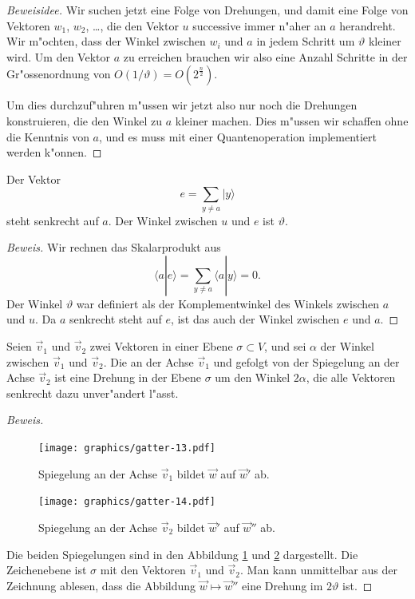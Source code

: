 \begin{proof}[Beweisidee]
Wir suchen jetzt eine Folge von Drehungen, und damit
eine Folge von Vektoren $w_1$, $w_2$, \dots, die den Vektor $u$ successive
immer n"aher an $a$ herandreht.
Wir m"ochten, dass der Winkel zwischen $w_i$ und $a$ in jedem Schritt 
um $\vartheta$ kleiner wird.
Um den Vektor $a$ zu erreichen brauchen wir also eine Anzahl Schritte
in der Gr"ossenordnung von $O(1/\vartheta)=O(2^{\frac{n}2})$.

Um dies durchzuf"uhren m"ussen wir jetzt also nur noch die Drehungen
konstruieren, die den Winkel zu $a$ kleiner machen.
Dies m"ussen wir schaffen ohne die Kenntnis von $a$, und es muss mit
einer Quantenoperation implementiert werden k"onnen.
\end{proof}

\begin{hilfssatz}
Der Vektor
\[
e=\sum_{y\ne a}|y\rangle
\]
steht senkrecht auf $a$.
Der Winkel zwischen $u$ und $e$ ist $\vartheta$.
\label{skript:hilfssatz-winkel}
\end{hilfssatz}

\begin{proof}[Beweis]
Wir rechnen das Skalarprodukt aus
\[
\langle a|e\rangle
=
\sum_{y\ne a}\langle a|y\rangle =0.
\]
Der Winkel $\vartheta$ war definiert als der Komplementwinkel
des Winkels zwischen $a$ und $u$.
Da $a$ senkrecht steht auf $e$, ist das auch der Winkel zwischen
$e$ und $a$.
\end{proof}

\begin{hilfssatz}
Seien $\vec v_1$ und $\vec v_2$ zwei Vektoren in einer Ebene
$\sigma\subset V$, und sei $\alpha$ der Winkel zwischen $\vec v_1$
und $\vec v_2$.
Die an der Achse $\vec v_1$ und gefolgt von der Spiegelung an der Achse
$\vec v_2$ ist eine Drehung in der Ebene $\sigma$ um den Winkel $2\alpha$,
die alle Vektoren senkrecht dazu unver"andert l"asst.
\label{skript:hilfssatz-drehung}
\end{hilfssatz}

\begin{proof}[Beweis]
\begin{figure}
\centering
\texttt{[image: graphics/gatter-13.pdf]}
\caption{Spiegelung an der Achse $\vec v_1$ bildet $\vec w$ auf $\vec w'$ ab.
\label{skript:drehung-spiegelung-1}}
\end{figure}
\begin{figure}
\centering
\texttt{[image: graphics/gatter-14.pdf]}
\caption{Spiegelung an der Achse $\vec v_2$ bildet $\vec w'$ auf $\vec w''$ ab.
\label{skript:drehung-spiegelung-2}}
\end{figure}
Die beiden Spiegelungen sind in den Abbildung
\ref{skript:drehung-spiegelung-1}
und
\ref{skript:drehung-spiegelung-2}
dargestellt.
Die Zeichenebene ist $\sigma$ mit den Vektoren $\vec v_1$ und $\vec v_2$.
Man kann unmittelbar aus der Zeichnung ablesen, dass
die Abbildung $\vec w\mapsto \vec w''$ eine Drehung im $2\vartheta$ ist.
\end{proof}

